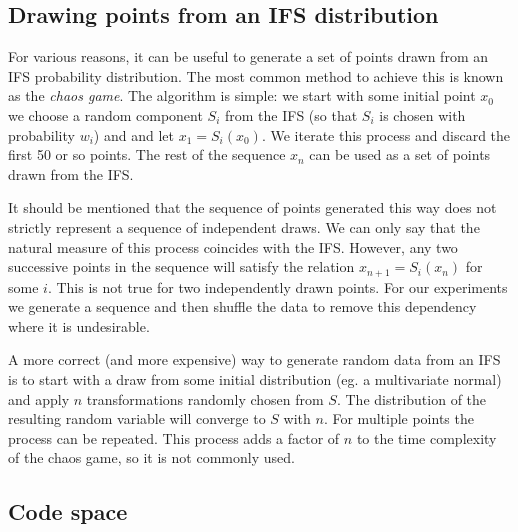 \documentclass[10pt,a4paper,oneside]{article}
\theoremstyle{definition}
\begin{document}
\subsection*{Drawing points from an IFS distribution}

For various reasons, it can be useful to generate a set of points drawn from an IFS probability distribution. The most common method to achieve this is known as the \emph{chaos game}. The algorithm is simple: we start with some initial point $x_0$ we choose a random component $S_i$ from the IFS (so that $S_i$ is chosen with probability $w_i$) and and let $x_1 = S_i(x_0)$. We iterate this process and discard the first 50 or so points. The rest of the sequence $x_n$ can be used as a set of points drawn from the IFS.

It should be mentioned that the sequence of points generated this way does not strictly represent a sequence of independent draws. We can only say that the natural measure of this process coincides with the IFS. However, any two successive points in the sequence will satisfy the relation $x_{n+1} = S_i(x_{n})$ for some $i$. This is not true for two independently drawn points. For our experiments we generate a sequence and then shuffle the data to remove this dependency where it is undesirable.

A more correct (and more expensive) way to generate random data from an IFS is to start with a draw from some initial distribution (eg. a multivariate normal) and apply $n$ transformations randomly chosen from $S$. The distribution of the resulting random variable will converge to $S$ with $n$. For multiple points the process can be repeated. This process adds a factor of $n$ to the time complexity of the chaos game, so it is not commonly used. 

\subsection*{Code space}
\label{sec:code-space}
\end{document}
